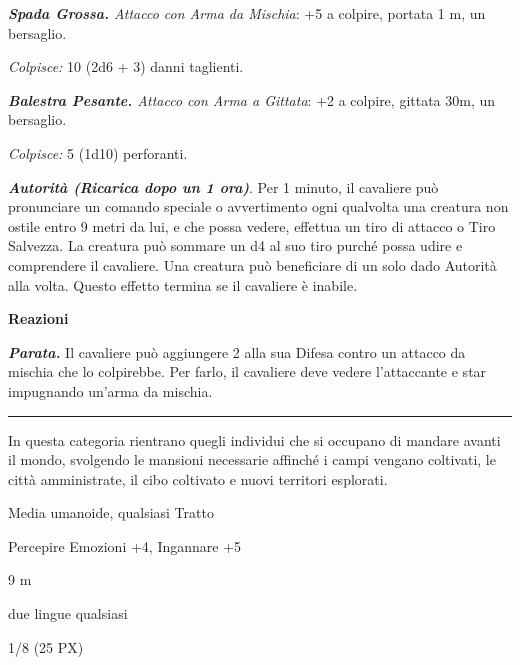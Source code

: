 \begin{multicols}{2}
{\emph{\textbf{Spada Grossa.} Attacco con Arma da Mischia}: +5 a colpire, portata 1 m, un bersaglio.

\emph{Colpisce:} 10 (2d6 + 3) danni taglienti.

\emph{\textbf{Balestra Pesante.} Attacco con Arma a Gittata}: +2 a colpire, gittata 30m, un bersaglio.

\emph{Colpisce:} 5 (1d10) perforanti.

\emph{\textbf{Autorità (Ricarica dopo un 1 ora)}}. Per 1 minuto, il cavaliere può pronunciare un comando speciale o avvertimento ogni qualvolta una creatura non ostile entro 9 metri da lui, e che possa vedere, effettua un tiro di attacco o Tiro Salvezza. La creatura può sommare un d4 al suo tiro purché possa udire e comprendere il cavaliere. Una creatura può beneficiare di un solo dado Autorità alla volta. Questo effetto termina se il cavaliere è inabile.

\textbf{Reazioni}

\emph{\textbf{Parata.}} Il cavaliere può aggiungere 2 alla sua Difesa contro un attacco da mischia che lo colpirebbe. Per farlo, il cavaliere deve vedere l'attaccante e star impugnando un'arma da mischia.





\noindent\rule{\linewidth}{2pt} \hypertarget{Cittadini}{}

In questa categoria rientrano quegli individui che si occupano di mandare avanti il mondo, svolgendo le mansioni necessarie affinché i campi vengano coltivati, le città amministrate, il cibo coltivato e
nuovi territori esplorati.

\begin{description}[noitemsep, topsep=0pt, parsep=0pt, partopsep=0pt, itemsep=1pt, leftmargin=2.35cm,  labelwidth=2.2cm, itemindent=0cm, listparindent=0pt] %
\setlength{\baselineskip}{10pt}
\item[\textbf{Taglia/Tipo}] Media umanoide, qualsiasi Tratto
\item[\textbf{Caratt.}] 
\item[\textbf{Punti Ferita}] 
\item[\textbf{Comp.}] Percepire Emozioni +4, Ingannare +5
\item[\textbf{Tiri Salvez.}] 
\item[\textbf{Movimento}] 9 m
\item[\textbf{Linguaggi}] due lingue qualsiasi
\item[\textbf{Sfida}] 1/8 (25 PX)
\end{description}
\smallskip

}
\end{multicols}
